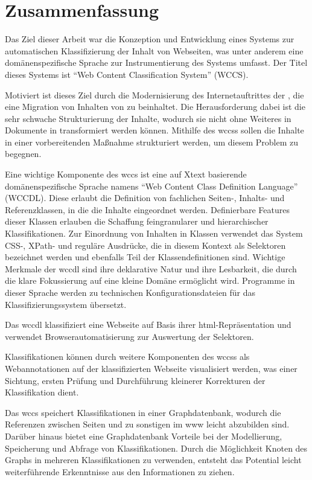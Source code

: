 \section{Zusammenfassung}
    Das Ziel dieser Arbeit war die Konzeption und Entwicklung
    eines Systems zur automatischen Klassifizierung der Inhalt
    von Webseiten, was unter anderem eine domänenspezifische
    Sprache zur Instrumentierung des Systems umfasst.
    Der Titel dieses Systems ist
    "`Web Content Classification System"' (WCCS).

    Motiviert ist dieses Ziel durch die Modernisierung des
    Internetauftrittes der {\fernUni},
    die eine Migration von Inhalten von {\wordpress} zu
    {\imperia} beinhaltet.
    Die Herausforderung dabei ist die sehr schwache Strukturierung
    der Inhalte, wodurch sie nicht ohne Weiteres in
    Dokumente in {\imperia} transformiert werden können.
    Mithilfe des \glspl{wccs} sollen die Inhalte in einer vorbereitenden
    Maßnahme strukturiert werden, um diesem Problem zu begegnen.

    Eine wichtige Komponente des \gls{wccs} ist eine auf Xtext basierende
    domänenspezifische Sprache namens "`Web Content Class Definition Language"' (WCCDL).
    Diese erlaubt die Definition von fachlichen Seiten-, Inhalts- und
    Referenzklassen, in die die Inhalte eingeordnet werden.
    Definierbare Features dieser Klassen erlauben die Schaffung feingranularer
    und hierarchischer Klassifikationen.
    Zur Einordnung von Inhalten in Klassen verwendet das System
    CSS-, XPath- und reguläre Ausdrücke, die in diesem Kontext als
    Selektoren bezeichnet werden und
    ebenfalls Teil der Klassendefinitionen sind.
    Wichtige Merkmale der \gls{wccdl} sind ihre deklarative Natur
    und ihre Lesbarkeit,
    die durch die klare Fokussierung auf eine kleine Domäne ermöglicht wird.
    Programme in dieser Sprache werden zu technischen
    Konfigurationsdateien für das Klassifizierungssystem übersetzt.

    Das \gls{wccdl} klassifiziert eine Webseite auf Basis ihrer
    \gls{html}-Repräsentation und verwendet Browserautomatisierung
    zur Auswertung der Selektoren.

    Klassifikationen können durch weitere Komponenten des \glspl{wccs}
    als Webannotationen auf der klassifizierten Webseite visualisiert werden,
    was einer Sichtung, ersten Prüfung und Durchführung kleinerer
    Korrekturen der Klassifikation dient.

    Das \gls{wccs} speichert Klassifikationen in einer Graphdatenbank,
    wodurch die Referenzen zwischen Seiten und zu sonstigen {\resources}
    im \gls{www} leicht abzubilden sind.
    Darüber hinaus bietet eine Graphdatenbank Vorteile bei der Modellierung,
    Speicherung und Abfrage von Klassifikationen.
    Durch die Möglichkeit Knoten des Graphs in mehreren Klassifikationen
    zu verwenden, entsteht das Potential leicht weiterführende Erkenntnisse
    aus den Informationen zu ziehen.

